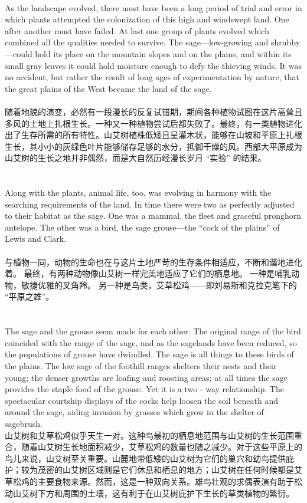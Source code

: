 \documentclass{article}
\begin{document}
\\
As the landscape evolved, there must have been a long period of trial and error in which plants attempted the colonization of this high and windswept land. One after another must have failed. At last one group of plants evolved which combined all the qualities needed to survive. The sage—low-growing and shrubby—could hold its place on the mountain slopes and on the plains, and within its small gray leaves it could hold moisture enough to defy the thieving winds. It was no accident, but rather the result of long ages of experimentation by nature, that the great plains of the West became the land of the sage.\\\\
随着地貌的演变，必然有一段漫长的反复试错期，期间各种植物试图在这片高耸且多风的土地上扎根生长。一种又一种植物尝试后都失败了。最终，有一类植物进化出了生存所需的所有特性。山艾树植株低矮且呈灌木状，能够在山坡和平原上扎根生长，其小小的灰绿色叶片能够储存足够的水分，抵御干燥的风。西部大平原成为山艾树的生长之地并非偶然，而是大自然历经漫长岁月 “实验” 的结果。 \\\\

\\
Along with the plants, animal life, too, was evolving in harmony with the searching requirements of the land. In time there were two as perfectly adjusted to their habitat as the sage. One was a mammal, the fleet and graceful pronghorn antelope. The other was a bird, the sage grouse—the “cock of the plains” of Lewis and Clark.\\\\
与植物一同，动物的生命也在与这片土地严苛的生存条件相适应，不断和谐地进化着。 最终，有两种动物像山艾树一样完美地适应了它们的栖息地。 一种是哺乳动物，敏捷优雅的叉角羚。 另一种是鸟类，艾草松鸡——即刘易斯和克拉克笔下的 “平原之雄”。\\\\

\\
The sage and the grouse seem made for each other. The original range of the bird coincided with the range of the sage, and as the sagelands have been reduced, so the populations of grouse have dwindled. The sage is all things to these birds of the plains. The low sage of the foothill ranges shelters their nests and their young; the denser growths are loafing and roosting areas; at all times the sage provides the staple food of the grouse. Yet it is a two - way relationship. The spectacular courtship displays of the cocks help loosen the soil beneath and around the sage, aiding invasion by grasses which grow in the shelter of sagebrush.\\
山艾树和艾草松鸡似乎天生一对。这种鸟最初的栖息地范围与山艾树的生长范围重合，随着山艾树生长地面积减少，艾草松鸡的数量也随之减少。对于这些平原上的鸟儿来说，山艾树至关重要。山麓地带低矮的山艾树为它们的巢穴和幼鸟提供庇护；较为茂密的山艾树区域则是它们休息和栖息的地方；山艾树在任何时候都是艾草松鸡的主要食物来源。然而，这是一种双向关系。雄鸟壮观的求偶表演有助于松动山艾树下方和周围的土壤，这有利于在山艾树庇护下生长的草类植物的繁衍。 \\
\end{document}
